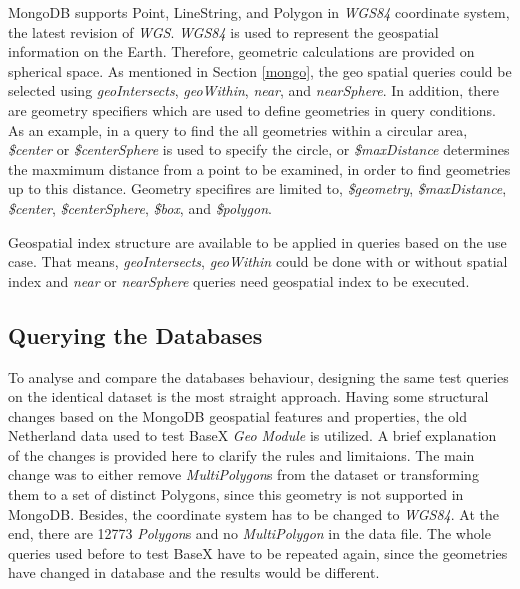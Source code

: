 \documentclass[a4paper,12pt]{article}
\begin{document}
MongoDB supports Point, LineString, and Polygon in \textit{WGS84} coordinate system, the latest revision of \textit{WGS}. \textit{WGS84} is used to represent the geospatial information on the Earth. Therefore, geometric calculations are provided on spherical space. As mentioned in Section \ref{mongo}, the geo spatial queries could be selected using \textit{geoIntersects}, \textit{geoWithin}, \textit{near}, and \textit{nearSphere}. In addition, there are geometry specifiers which are used to define geometries in query conditions. As an example, in a query to find the all geometries within a circular area, \textit{\$center} or \textit{\$centerSphere} is used to specify the circle, or \textit{\$maxDistance} determines the maxmimum distance from a point to be examined, in order to find geometries up to this distance. Geometry specifires are limited to, \textit{\$geometry}, \textit{\$maxDistance}, \textit{\$center}, \textit{\$centerSphere}, \textit{\$box}, and \textit{\$polygon}.

 
Geospatial index structure are available to be applied in queries based on the use case. That means, \textit{geoIntersects}, \textit{geoWithin} could be done with or without spatial index and \textit{near} or \textit{nearSphere} queries need geospatial index to be executed.

\subsection{Querying the Databases}

To analyse and compare the databases behaviour, designing the same test queries on the identical dataset is the most straight approach. Having some structural changes based on the MongoDB geospatial features and properties, the old Netherland data used to test BaseX \textit{Geo Module} is utilized. A brief explanation of the changes is provided here to clarify the rules and limitaions. The main change was to either remove \textit{MultiPolygon}s from the dataset or transforming them to a set of distinct Polygons, since this geometry is not supported in MongoDB. Besides, the coordinate system has to be changed to \textit{WGS84}. At the end, there are 12773 \textit{Polygon}s and no \textit{MultiPolygon} in the data file. The whole queries used before to test BaseX have to be repeated again, since the geometries have changed in database and the results would be different. 
\end{document}
